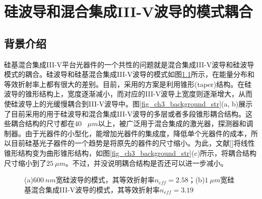 \chapter{硅波导和混合集成III-V波导的模式耦合}
\section{背景介绍}
硅基混合集成III-V平台光器件的一个共性的问题就是混合集成III-V波导和硅波导模式的耦合。硅波导和硅基混合集成III-V波导的模式如图\ref{fig_ch3_si_hybrid_mode}所示，在能量分布和等效折射率上都有很大的差别。目前，采用的方案是利用锥形(taper)结构。在硅波导的锥形结构上，宽度逐渐减小，而对应的III-V波导上宽度则逐渐增大，从而使硅波导上的光缓慢耦合到III-V波导中。图\ref{fig_ch3_background_str}(a, b)展示了目前采用的用于硅波导和混合集成III-V波导的多层或者多段锥形耦合结构\cite{kurczveil2013characterization, keyvaninia2009engineering}。这些耦合结构的尺寸都在40 ~$\mu m$以上，被广泛用于混合集成的激光器，探测器和调制器。由于光器件的小型化，能增加光器件的集成度，降低单个光器件的成本，所以目前硅基光子器件的一个趋势是将原先的器件的尺寸缩小。为此，文献[]将线性锥形结构变为曲形锥形结构，如图\ref{fig_ch3_background_str}(c)所示，将耦合结构尺寸缩小到了$25~\mu m$。不过，并没说明耦合结构是否还可以进一步减小。
\begin{figure}[htb]
	\small
	\caption{(a)$600~nm$宽硅波导的模式，其等效折射率$n_{eff}=2.58$；(b)$1~\mu m$宽硅基混合集成III-V波导的模式，其等效折射率$n_{eff}=3.19$}
	\label{fig_ch3_si_hybrid_mode}	
\end{figure}
		
